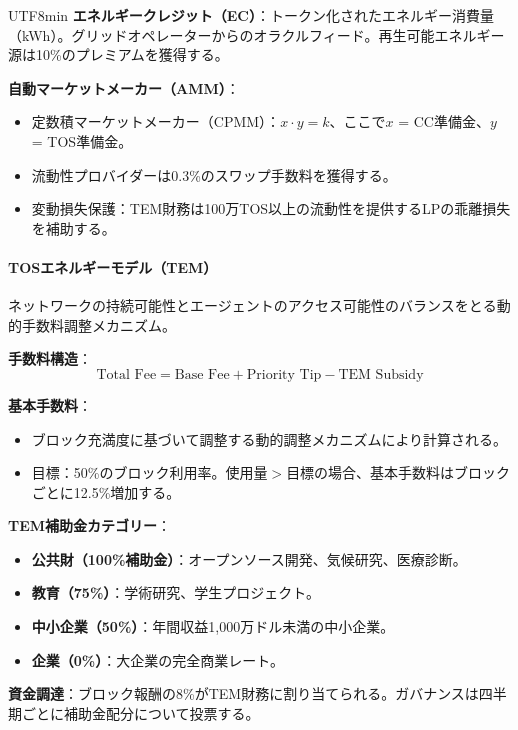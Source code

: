 \documentclass[11pt]{article}
\begin{document}
\begin{CJK}{UTF8}{min}
\textbf{エネルギークレジット（EC）}：トークン化されたエネルギー消費量（kWh）。グリッドオペレーターからのオラクルフィード。再生可能エネルギー源は10\%のプレミアムを獲得する。

\textbf{自動マーケットメーカー（AMM）}：
\begin{itemize}[noitemsep]
  \item 定数積マーケットメーカー（CPMM）：$x \cdot y = k$、ここで$x$ = CC準備金、$y$ = TOS準備金。
  \item 流動性プロバイダーは0.3\%のスワップ手数料を獲得する。
  \item 変動損失保護：TEM財務は100万TOS以上の流動性を提供するLPの乖離損失を補助する。
\end{itemize}

\paragraph{TOSエネルギーモデル（TEM）}
ネットワークの持続可能性とエージェントのアクセス可能性のバランスをとる動的手数料調整メカニズム。

\textbf{手数料構造}：
\begin{equation}
\text{Total Fee} = \text{Base Fee} + \text{Priority Tip} - \text{TEM Subsidy}
\end{equation}

\textbf{基本手数料}：
\begin{itemize}[noitemsep]
  \item ブロック充満度に基づいて調整する動的調整メカニズムにより計算される。
  \item 目標：50\%のブロック利用率。使用量$>$目標の場合、基本手数料はブロックごとに12.5\%増加する。
\end{itemize}

\textbf{TEM補助金カテゴリー}：
\begin{itemize}[noitemsep]
  \item \textbf{公共財（100\%補助金）}：オープンソース開発、気候研究、医療診断。
  \item \textbf{教育（75\%）}：学術研究、学生プロジェクト。
  \item \textbf{中小企業（50\%）}：年間収益1,000万ドル未満の中小企業。
  \item \textbf{企業（0\%）}：大企業の完全商業レート。
\end{itemize}

\textbf{資金調達}：ブロック報酬の8\%がTEM財務に割り当てられる。ガバナンスは四半期ごとに補助金配分について投票する。


\end{CJK}
\end{document}
